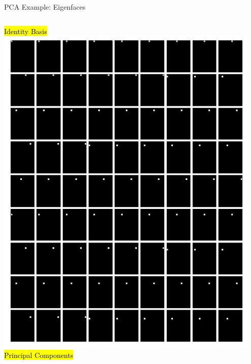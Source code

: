 \documentclass[handout,aspectratio=169]{beamer}
\begin{document}
	\begin{frame}{PCA Example: Eigenfaces}
		\begin{columns}
			\centering
			\hl{Identity Basis}\\
			\includegraphics[width=0.95\textwidth]{media/eigenfaces_normal_basis.pdf}
			\centering
			\hl{Principal Components}\\

\end{columns}
\end{frame}
\end{document}
